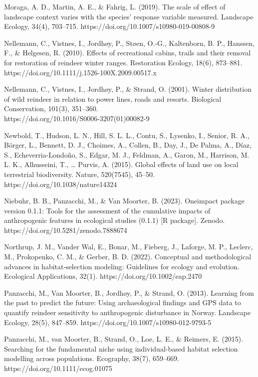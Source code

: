 \documentclass[titlepage]{article}
\begin{document}
Moraga, A. D., Martin, A. E., & Fahrig, L. (2019). The scale of effect of landscape context varies with the species’ response variable measured. Landscape Ecology, 34(4), 703–715. https://doi.org/10.1007/s10980-019-00808-9

Nellemann, C., Vistnes, I., Jordhøy, P., Støen, O.-G., Kaltenborn, B. P., Hanssen, F., & Helgesen, R. (2010). Effects of recreational cabins, trails and their removal for restoration of reindeer winter ranges. Restoration Ecology, 18(6), 873–881. https://doi.org/10.1111/j.1526-100X.2009.00517.x

Nellemann, C., Vistnes, I., Jordhøy, P., & Strand, O. (2001). Winter distribution of wild reindeer in relation to power lines, roads and resorts. Biological Conservation, 101(3), 351–360.\\ https://doi.org/10.1016/S0006-3207(01)00082-9

Newbold, T., Hudson, L. N., Hill, S. L. L., Contu, S., Lysenko, I., Senior, R. A., Börger, L., Bennett, D. J., Choimes, A., Collen, B., Day, J., De Palma, A., Díaz, S., Echeverria-Londoño, S., Edgar, M. J., Feldman, A., Garon, M., Harrison, M. L. K., Alhusseini, T., … Purvis, A. (2015). Global effects of land use on local terrestrial biodiversity. Nature, 520(7545), 45–50. https://doi.org/10.1038/nature14324

Niebuhr, B. B., Panzacchi, M., & Van Moorter, B. (2023). Oneimpact package version 0.1.1: Tools for the assessment of the cumulative impacts of anthropogenic features in ecological studies (0.1.1) [R package]. Zenodo. https://doi.org/10.5281/zenodo.7888674

Northrup, J. M., Vander Wal, E., Bonar, M., Fieberg, J., Laforge, M. P., Leclerc, M., Prokopenko, C. M., & Gerber, B. D. (2022). Conceptual and methodological advances in habitat‐selection modeling: Guidelines for ecology and evolution. Ecological Applications, 32(1). https://doi.org/10.1002/eap.2470

Panzacchi, M., Van Moorter, B., Jordhøy, P., & Strand, O. (2013). Learning from the past to predict the future: Using archaeological findings and GPS data to quantify reindeer sensitivity to anthropogenic disturbance in Norway. Landscape Ecology, 28(5), 847–859. https://doi.org/10.1007/s10980-012-9793-5

Panzacchi, M., van Moorter, B., Strand, O., Loe, L. E., & Reimers, E. (2015). Searching for the fundamental niche using individual-based habitat selection modelling across populations. Ecography, 38(7), 659–669. https://doi.org/10.1111/ecog.01075
\end{document}
